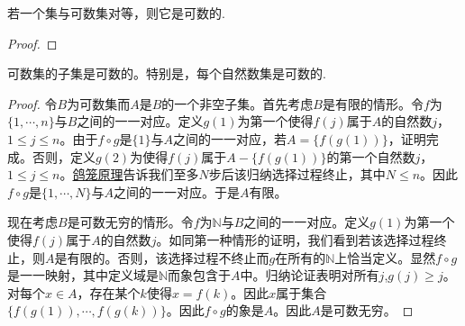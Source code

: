 \documentclass[lang=cn,newtx,10pt,scheme=chinese]{elegantbook}
\begin{document}
\begin{proposition}\label{proposition:与可数集对等的集合是可数集}
  若一个集与可数集对等，则它是可数的.
\end{proposition}
\begin{proof}
  
\end{proof}

\begin{theorem}\label{theorem:可数集的子集是可数的}
  可数集的子集是可数的。特别是，每个自然数集是可数的.
\end{theorem}
\begin{proof}
  令\(B\)为可数集而\(A\)是\(B\)的一个非空子集。首先考虑\(B\)是有限的情形。令\(f\)为\(\{1, \cdots, n\}\)与\(B\)之间的一一对应。定义\(g(1)\)为第一个使得\(f(j)\)属于\(A\)的自然数\(j\)，\(1\leqslant j\leqslant n\)。由于\(f\circ g\)是\(\{1\}\)与\(A\)之间的一一对应，若\(A = \{f(g(1))\}\)，证明完成。否则，定义\(g(2)\)为使得\(f(j)\)属于\(A-\{f(g(1))\}\)的第一个自然数\(j\)，\(1\leqslant j\leqslant n\)。\hyperref[theorem:鸽笼原理]{鸽笼原理}告诉我们至多\(N\)步后该归纳选择过程终止，其中\(N\leqslant n\)。因此\(f\circ g\)是\(\{1, \cdots, N\}\)与\(A\)之间的一一对应。于是\(A\)有限。

现在考虑\(B\)是可数无穷的情形。令\(f\)为\(\mathbb{N}\)与\(B\)之间的一一对应。定义\(g(1)\)为第一个使得\(f(j)\)属于\(A\)的自然数\(j\)。如同第一种情形的证明，我们看到若该选择过程终止，则\(A\)是有限的。否则，该选择过程不终止而\(g\)在所有的\(\mathbb{N}\)上恰当定义。显然\(f\circ g\)是一一映射，其中定义域是\(\mathbb{N}\)而象包含于\(A\)中。归纳论证表明对所有\(j\),\(g(j)\geqslant j\)。对每个\(x\in A\)，存在某个\(k\)使得\(x = f(k)\)。因此\(x\)属于集合\(\{f(g(1)), \cdots, f(g(k))\}\)。因此\(f\circ g\)的象是\(A\)。因此\(A\)是可数无穷。
\end{proof}
\end{document}
